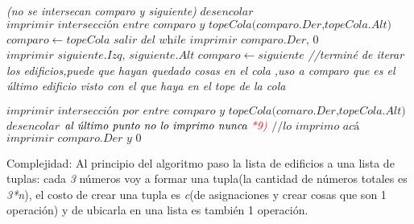 \documentclass{article}
\begin{document}
\begin{algorithmic}[1]
                \Else \textit{(no se intersecan comparo y siguiente\color{red}{*4})}
                                        \State $\textit{desencolar}$
                                        \Else 
                                        \State $\textit{imprimir intersección entre comparo y topeCola(comparo.Der,topeCola.Alt)}$
                                        \State $comparo\gets topeCola$
                                        \State $\textit{salir del while}$
                                        \EndIf
                                \EndWhile
                        \State $\textit{imprimir comparo.Der, 0 }$
                        \State $\textit{imprimir siguiente.Izq, siguiente.Alt}$
                        \State $comparo\gets siguiente$
                        \EndIf
                \EndIf
        \EndFor\textit{//terminé de iterar los edificios,puede que hayan quedado cosas en el cola \color{red}{*6}\color{black},uso a comparo que es el último edificio visto con el que haya en el tope de la cola} \newpage
        
                \State $\textit{imprimir intersección por entre comparo y topeCola(comaro.Der,topeCola.Alt)}$
                \EndIf
                \State $\textit{desencolar}$    
        \EndFor
        \State $\textit{al último punto no lo imprimo nunca \color{red}{*9})}$
        \State $\textit{$//$lo imprimo acá}$
        \State $\textit{imprimir comparo.Der y 0}$
\EndProcedure
\end{algorithmic}
\newpage
{\noindent \Huge Complejidad:}
\newline \newline
Al principio del algoritmo paso la lista de edificios a una lista de tuplas:
cada \textit{3} números voy a formar una tupla(la cantidad de números totales es \textit{3*n}), el costo de crear una tupla es \textit{c}(de asignaciones y crear cosas que son 1 operación) y de ubicarla en una lista es también 1 operación.\newline
\end{document}
